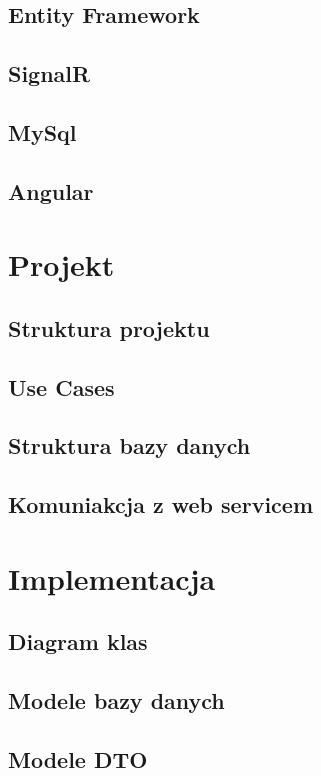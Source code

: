 \documentclass[10pt,a4paper]{article}
\begin{document}
\subsection{Entity Framework}   %
\subsection{SignalR} 			%
\subsection{MySql} 				%
\subsection{Angular} 			%

\section{Projekt}

\subsection{Struktura projektu}			%
\subsection{Use Cases}					%
\subsection{Struktura bazy danych}  	%
\subsection{Komuniakcja z web servicem} %

\section{Implementacja}

\subsection{Diagram klas}					%
\subsection{Modele bazy danych}				%
\subsection{Modele DTO} 					%
\end{document}
